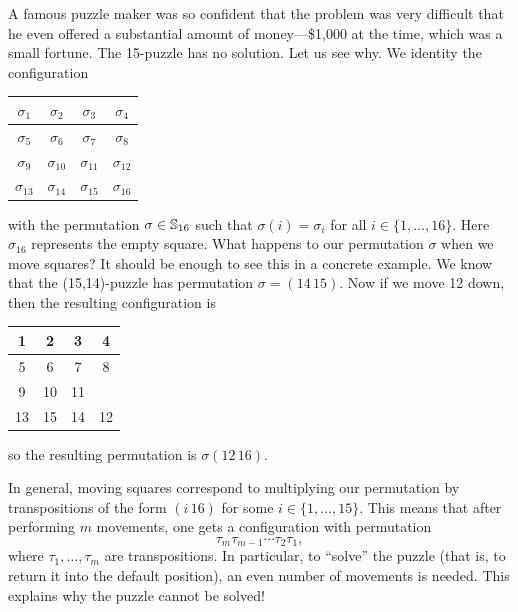 A famous puzzle maker was so confident that the problem was very difficult 
that he even offered a substantial amount of money—\$1,000 at the time, which was a small fortune. 
The 15-puzzle has no solution. Let us see why.
We identity the configuration 
\bigskip 
    \begin{center}
        \begin{tabular}{|c|c|c|c|}
            \hline
            $\sigma_1$ & $\sigma_2$ & $\sigma_3$ & $\sigma_4$\\
            \hline
            $\sigma_5$ & $\sigma_6$ & $\sigma_7$ & $\sigma_8$\\
            \hline
            $\sigma_9$ & $\sigma_{10}$ & $\sigma_{11}$ & $\sigma_{12}$\\
            \hline
            $\sigma_{13}$ & $\sigma_{14}$ & $\sigma_{15}$ & $\sigma_{16}$\\
            \hline
        \end{tabular}
    \end{center}
\bigskip 
with the permutation $\sigma\in\mathbb{S}_{16}$ such that  
$\sigma(i)=\sigma_i$ for all $i\in\{1,\dots,16\}$. Here $\sigma_{16}$ 
represents the empty square. What happens to our permutation 
$\sigma$ when we move squares? It should be enough to see 
this in a concrete example. We know that the (15,14)-puzzle has
permutation $\sigma=(14\,15)$. Now if 
we move 12 down, then the resulting 
configuration is 
\bigskip 
    \begin{center}
        \begin{tabular}{|c|c|c|c|}
            \hline
            1 & 2 & 3 & 4\\
            \hline
            5 & 6 & 7 & 8\\
            \hline
            9 & 10 & 11 & \\
            \hline
            13 & 15 & 14 & 12\\
            \hline
        \end{tabular}
    \end{center}
\bigskip 
so the resulting permutation 
is $\sigma(12\,16)$. 

In general, moving squares correspond to multiplying  
our permutation by transpositions of the form $(i\,16)$ for
some $i\in\{1,\dots,15\}$. This means that 
after performing $m$ movements, 
one gets a configuration with 
permutation
\[
\tau_m\tau_{m-1}\cdots\tau_2\tau_1,
\]
where $\tau_1,\dots,\tau_m$ are transpositions. In particular, 
to ``solve'' the puzzle (that is, to return it into the default position), 
an even number of 
movements is needed. This explains why the puzzle cannot
be solved! 

